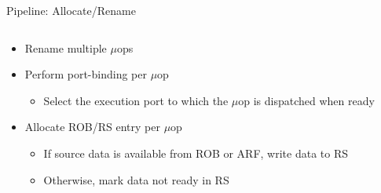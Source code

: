 \documentclass[aspectratio=169,12pt]{beamer}
\begin{document}
\begin{frame}{Pipeline: Allocate/Rename}
    \centering
    
    \vspace{0.5cm}
    \begin{columns}[T]
        \begin{column}{0.9\textwidth}
            \begin{itemize}
                \item Rename multiple $\mu$ops
                \item Perform port-binding per $\mu$op
                \begin{itemize}
                    \item Select the execution port to which the $\mu$op is dispatched when ready
                \end{itemize}
                \item Allocate ROB/RS entry per $\mu$op
                \begin{itemize}
                    \item If source data is available from ROB or ARF, write data to RS
                    \item Otherwise, mark data not ready in RS
                \end{itemize}
            \end{itemize}
        \end{column}
    \end{columns}
\end{frame}
\end{document}
